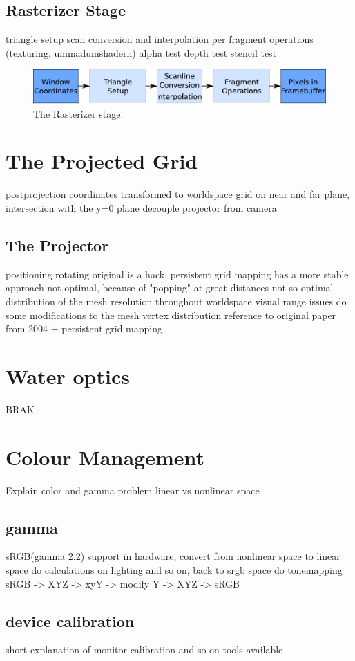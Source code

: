 \subsection{Rasterizer Stage}

triangle setup
scan conversion and interpolation
per fragment operations (texturing, ummadumshadern)
alpha test
depth test
stencil test
\begin{figure}[h]
\begin{center}
\includegraphics[scale=0.5]{Images/Rasterizer-Stage.pdf}
\caption{The Rasterizer stage.}
\label{fig:RasterizerStage}
\end{center}
\end{figure}

\section{The Projected Grid}

postprojection coordinates transformed to worldspace
grid on near and far plane, intersection with the y=0 plane
decouple projector from camera

\subsection{The Projector}
positioning
rotating
original is a hack, persistent grid mapping has a more stable approach
not optimal, because of "popping" at great distances
not so optimal distribution of the mesh resolution throughout worldspace
visual range issues
do some modifications to the mesh vertex distribution
reference to original paper from 2004 + persistent grid mapping

\section{Water optics}
BRAK

\section{Colour Management}

Explain color and gamma problem
linear vs nonlinear space

\subsection{gamma}
sRGB(gamma 2.2) support in hardware, convert from nonlinear space to linear
space do calculations on lighting and so on, back to srgb space
do tonemapping sRGB -> XYZ -> xyY -> modify Y -> XYZ -> sRGB

\subsection{device calibration}
short explanation of monitor calibration and so on
tools available


